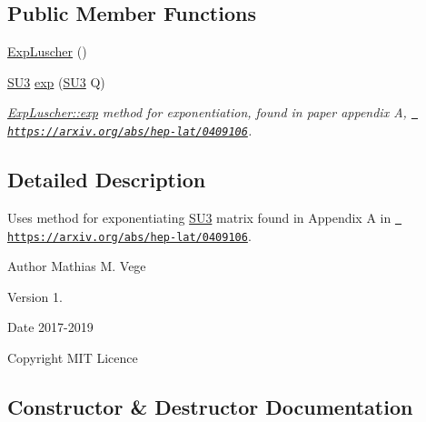 \subsection*{Public Member Functions}
\begin{DoxyCompactItemize}
\item 
\mbox{\hyperlink{class_exp_luscher_a32755f1fe29dd538db104db28151d93b}{Exp\+Luscher}} ()
\item 
\mbox{\hyperlink{class_s_u3}{S\+U3}} \mbox{\hyperlink{class_exp_luscher_a8e4c0689c633728527e1220094c664c1}{exp}} (\mbox{\hyperlink{class_s_u3}{S\+U3}} Q)
\begin{DoxyCompactList}\small\item\em \mbox{\hyperlink{class_exp_luscher_a8e4c0689c633728527e1220094c664c1}{Exp\+Luscher\+::exp}} method for exponentiation, found in paper appendix A, \href{https://arxiv.org/abs/hep-lat/0409106}{\texttt{ https\+://arxiv.\+org/abs/hep-\/lat/0409106}}. \end{DoxyCompactList}\end{DoxyCompactItemize}


\subsection{Detailed Description}
Uses method for exponentiating \mbox{\hyperlink{class_s_u3}{S\+U3}} matrix found in Appendix A in \href{https://arxiv.org/abs/hep-lat/0409106}{\texttt{ https\+://arxiv.\+org/abs/hep-\/lat/0409106}}. 

\begin{DoxyAuthor}{Author}
Mathias M. Vege 
\end{DoxyAuthor}
\begin{DoxyVersion}{Version}
1. 
\end{DoxyVersion}
\begin{DoxyDate}{Date}
2017-\/2019 
\end{DoxyDate}
\begin{DoxyCopyright}{Copyright}
M\+IT Licence 
\end{DoxyCopyright}


\subsection{Constructor \& Destructor Documentation}
\mbox{\label{class_exp_luscher_a32755f1fe29dd538db104db28151d93b}} 

